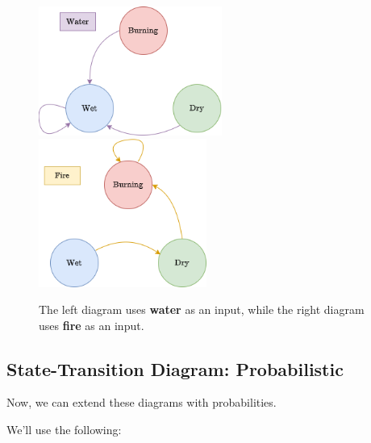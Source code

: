         \begin{figure}[H]
            \centering
            \includegraphics[width=60mm,scale=0.4]{images/rnn_images/std_water_no_label.png}
            \qquad
            \includegraphics[width=55mm,scale=0.4]{images/rnn_images/std_fire.png}
            
            \caption*{The left diagram uses \textbf{water} as an input, while the right diagram uses \textbf{fire} as an input.}
        \end{figure}



    \phantom{}

    \subsection{State-Transition Diagram: Probabilistic}

        Now, we can extend these diagrams with probabilities.

       We'll use the following:

